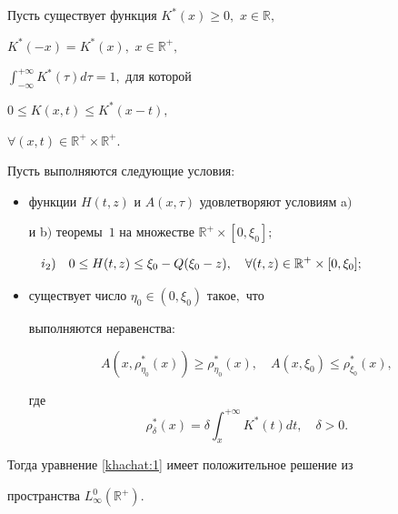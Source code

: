 \begin{theorem}[2]Пусть существует функция $K^*(x)\geq0,$ $x\in\mathbb{R},$

$K^*(-x)=K^*(x),$ $x\in\mathbb{R}^+,$

$\displaystyle \int _{-\infty}^{+\infty}K^*(\tau)d\tau=1,$ для которой


$

0\leq K(x,t)\leq K^*(x-t),$ %

$\forall

(x,t)\in\mathbb{R}^+\times\mathbb{R}^+

$.





Пусть выполняются следующие условия\/$:$

\begin{itemize}

\item[$i_1)$] функции $H(t,z)$ и $A(x,\tau)$ удовлетворяют условиям a$)$

и b$)$ теоремы~$1$ на множестве $\mathbb{R}^+\times[0,\xi_0];$



\begin{equation} \hspace{-6.5mm}

i_2)\quad 0\leq H(t,z)\leq\xi_0-Q(\xi_0-z),\quad

\forall(t,z)\in\mathbb{R}^+\times[0,\xi_0];\quad\qquad\qquad\,\,\label{khachat:10}

\end{equation}



\item[$i_3)$] существует число $\eta_0\in(0,\xi_0)$ такое$,$ что

выполняются неравенства\/$:$

\begin{equation}

A(x,\rho_{\eta_0}^*(x))\geq\rho_{\eta_0}^*(x),\quad

A(x,\xi_0)\leq\rho_{\xi_0}^*(x),\label{khachat:11}

\end{equation}

где $$\rho_\delta^*(x)=\delta\int _{x}^{+\infty}K^*(t)dt, \quad  \delta>0.$$

\end{itemize}



Тогда уравнение \eqref{khachat:1} имеет положительное решение из

пространства $L_{\infty}^0(\mathbb{R}^+).$

\end{theorem}



